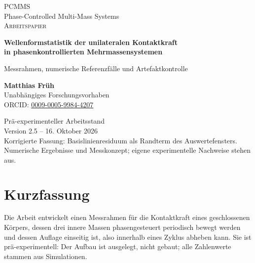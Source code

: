 \documentclass[12pt,a4paper]{report}
\begin{document}
\hypersetup{pageanchor=false}
\begin{titlepage}
\thispagestyle{empty}
\centering
\vspace*{1.2cm}
{\Large\textsc{PCMMS}}\\[0.3cm]
{\large Phase-Controlled Multi-Mass Systems}\\[1.5cm]
{\Large\textsc{Arbeitspapier}}\\[1.0cm]
{\LARGE\bfseries
Wellenformstatistik der unilateralen Kontaktkraft\\[0.3cm]
in phasenkontrollierten Mehrmassensystemen
\par}
\vspace{0.8cm}
{\large Messrahmen, numerische Referenzfälle und Artefaktkontrolle\par}
\vspace{1.5cm}
{\Large\textbf{Matthias Früh}}\\[0.4cm]
{\normalsize Unabhängiges Forschungsvorhaben}\\[0.3cm]
{\normalsize ORCID: \href{https://orcid.org/0009-0005-9984-4207}{0009-0005-9984-4207}}
\vfill
\begin{minipage}{0.9\textwidth}
\centering
Prä-experimenteller Arbeitsstand\\[0.3cm]
Version 2.5 -- 16. Oktober 2026\\[0.6cm]
\small
Korrigierte Fassung: Basislinienresiduum als Randterm des Auswertefensters.\\
Numerische Ergebnisse und Messkonzept; eigene experimentelle Nachweise stehen aus.
\end{minipage}
\vspace*{0.7cm}
\end{titlepage}

\hypersetup{pageanchor=true}
\tableofcontents
\clearpage

\chapter*{Kurzfassung}

Die Arbeit entwickelt einen Messrahmen für die Kontaktkraft eines
geschlossenen Körpers, dessen drei innere Massen phasengesteuert
periodisch bewegt werden und dessen Auflage einseitig ist, also innerhalb
eines Zyklus abheben kann. Sie ist prä-experimentell: Der Aufbau ist
ausgelegt, nicht gebaut; alle Zahlenwerte stammen aus Simulationen.
\end{document}
